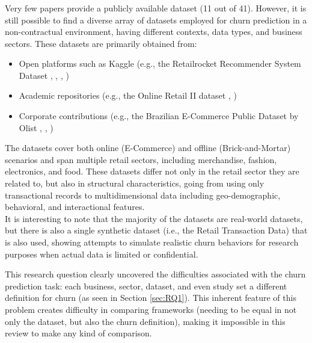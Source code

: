 \subsubsection{\RSRQsix}
\label{sec:RQ6}
Very few papers provide a publicly available dataset (11 out of 41). However, it is still possible to find a diverse array of datasets employed for churn prediction in a non-contractual environment, having different contexts, data types, and business sectors. These datasets are primarily obtained from:
\begin{itemize}
    \item Open platforms such as Kaggle (e.g., the Retailrocket Recommender System Dataset  \cite{Dat2-verma2021ecommerce},  \cite{Dat4-retailrocket2017dataset},  \cite{Dat5-usmani2020pakistan},  \cite{Dat6-regivm2021retail})
    \item Academic repositories (e.g., the Online Retail II dataset  \cite{Dat3-uci2021online},  \cite{Dat9-recsyswiki2015grocery})
    \item Corporate contributions (e.g., the Brazilian E-Commerce Public Dataset by Olist  \cite{Dat1-olist2018brazilian},  \cite{Dat7-dunnhumby2021source},  \cite{Dat8-dunnhumby2021source})
\end{itemize}
\nocite{Dat1-olist2018brazilian, Dat2-verma2021ecommerce, Dat3-uci2021online, Dat4-retailrocket2017dataset, Dat5-usmani2020pakistan, Dat6-regivm2021retail, Dat7-dunnhumby2021source, Dat8-dunnhumby2021source, Dat9-recsyswiki2015grocery}

The datasets cover both online (E-Commerce) and offline (Brick-and-Mortar) scenarios and span multiple retail sectors, including merchandise, fashion, electronics, and food. These datasets differ not only in the retail sector they are related to, but also in structural characteristics, going from using only transactional records to multidimensional data including geo-demographic, behavioral, and interactional features. \\
It is interesting to note that the majority of the datasets are real-world datasets, but there is also a single synthetic dataset (i.e., the Retail Transaction Data) that is also used, showing attempts to simulate realistic churn behaviors for research purposes when actual data is limited or confidential. 

This research question clearly uncovered the difficulties associated with the churn prediction task: each business, sector, dataset, and even study set a different definition for churn (as seen in Section \ref{sec:RQ1}). This inherent feature of this problem creates difficulty in comparing frameworks (needing to be equal in not only the dataset, but also the churn definition), making it impossible in this review to make any kind of comparison.


